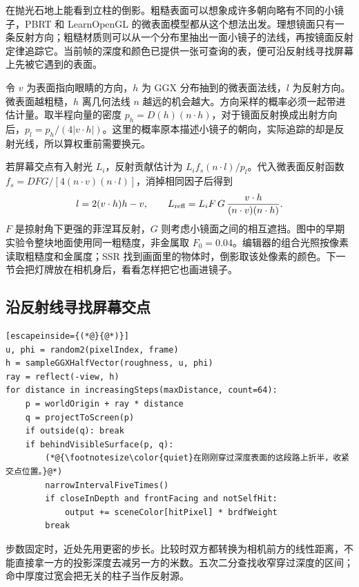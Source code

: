 在抛光石地上能看到立柱的倒影。粗糙表面可以想象成许多朝向略有不同的小镜子，PBRT 和 LearnOpenGL 的微表面模型都从这个想法出发。理想镜面只有一条反射方向；粗糙材质则可以从一个分布里抽出一面小镜子的法线，再按镜面反射定律追踪它。当前帧的深度和颜色已提供一张可查询的表，便可沿反射线寻找屏幕上先被它遇到的表面。

令 $v$ 为表面指向眼睛的方向，$h$ 为 GGX 分布抽到的微表面法线，$l$ 为反射方向。微表面越粗糙，$h$ 离几何法线 $n$ 越远的机会越大。方向采样的概率必须一起带进估计量。取半程向量的密度 $p_h=D(h)(n\cdot h)$，对于镜面反射换成出射方向后，$p_l=p_h/(4|v\cdot h|)$。这里的概率原本描述小镜子的朝向，实际追踪的却是反射光线，所以算权重前需要换元。

若屏幕交点有入射光 $L_i$，反射贡献估计为 $L_i f_s(n\cdot l)/p_l$。代入微表面反射函数 $f_s=DFG/[4(n\cdot v)(n\cdot l)]$，消掉相同因子后得到
\[
 l=2(v\cdot h)h-v,\qquad
 L_{\rm refl}= L_i F\,G\,\frac{v\cdot h}{(n\cdot v)(n\cdot h)}.
\]
$F$ 是掠射角下更强的菲涅耳反射，$G$ 则考虑小镜面之间的相互遮挡。图中的早期实验令整块地面使用同一粗糙度，非金属取 $F_0=0.04$。编辑器的组合光照按像素读取粗糙度和金属度；SSR 找到画面里的物体时，倒影取该处像素的颜色。下一节会把灯牌放在相机身后，看看怎样把它也画进镜子。
\clearpage
\subsection{沿反射线寻找屏幕交点}
\par\nopagebreak
\begin{lstlisting}[escapeinside={(*@}{@*)}]
u, phi = random2(pixelIndex, frame)
h = sampleGGXHalfVector(roughness, u, phi)
ray = reflect(-view, h)
for distance in increasingSteps(maxDistance, count=64):
    p = worldOrigin + ray * distance
    q = projectToScreen(p)
    if outside(q): break
    if behindVisibleSurface(p, q):
        (*@{\footnotesize\color{quiet}在刚刚穿过深度表面的这段路上折半，收紧交点位置。}@*)
        narrowIntervalFiveTimes()
        if closeInDepth and frontFacing and notSelfHit:
            output += sceneColor[hitPixel] * brdfWeight
        break
\end{lstlisting}
步数固定时，近处先用更密的步长。比较时双方都转换为相机前方的线性距离，不能直接拿一方的投影深度去减另一方的米数。五次二分查找收窄穿过深度的区间；命中厚度过宽会把无关的柱子当作反射源。

